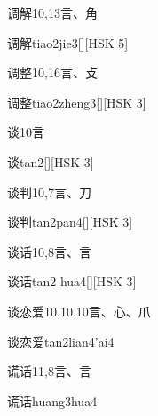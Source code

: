 \begin{entry}{调解}{10,13}{⾔、⾓}
  \begin{phonetics}{调解}{tiao2jie3}[][HSK 5]
  \end{phonetics}
\end{entry}

\begin{entry}{调整}{10,16}{⾔、⽁}
  \begin{phonetics}{调整}{tiao2zheng3}[][HSK 3]
  \end{phonetics}
\end{entry}

\begin{entry}{谈}{10}{⾔}
  \begin{phonetics}{谈}{tan2}[][HSK 3]
  \end{phonetics}
\end{entry}

\begin{entry}{谈判}{10,7}{⾔、⼑}
  \begin{phonetics}{谈判}{tan2pan4}[][HSK 3]
  \end{phonetics}
\end{entry}

\begin{entry}{谈话}{10,8}{⾔、⾔}
  \begin{phonetics}{谈话}{tan2 hua4}[][HSK 3]
  \end{phonetics}
\end{entry}

\begin{entry}{谈恋爱}{10,10,10}{⾔、⼼、⽖}
  \begin{phonetics}{谈恋爱}{tan2lian4'ai4}
  \end{phonetics}
\end{entry}

\begin{entry}{谎话}{11,8}{⾔、⾔}
  \begin{phonetics}{谎话}{huang3hua4}
  \end{phonetics}
\end{entry}

